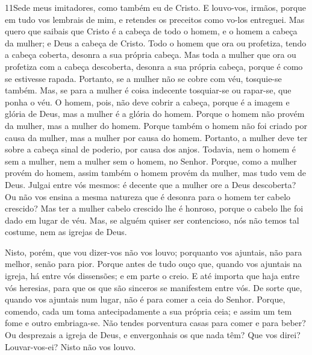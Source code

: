 \lettrine{11} Sede meus imitadores, como também eu de Cristo.
E louvo-vos, irmãos, porque em tudo vos lembrais de mim, e
retendes os preceitos como vo-los entreguei. Mas quero que
saibais que Cristo é a cabeça de todo o homem, e o homem a cabeça da
mulher; e Deus a cabeça de Cristo. Todo o homem que ora ou
profetiza, tendo a cabeça coberta, desonra a sua própria cabeça.
Mas toda a mulher que ora ou profetiza com a cabeça descoberta,
desonra a sua própria cabeça, porque é como se estivesse rapada.
Portanto, se a mulher não se cobre com véu, tosquie-se também.
Mas, se para a mulher é coisa indecente tosquiar-se ou rapar-se, que
ponha o véu. O homem, pois, não deve cobrir a cabeça, porque é a
imagem e glória de Deus, mas a mulher é a glória do homem.
Porque o homem não provém da mulher, mas a mulher do homem.
Porque também o homem não foi criado por causa da mulher, mas a
mulher por causa do homem. Portanto, a mulher deve ter sobre
a cabeça sinal de poderio, por causa dos anjos. Todavia, nem
o homem é sem a mulher, nem a mulher sem o homem, no Senhor.
Porque, como a mulher provém do homem, assim também o homem
provém da mulher, mas tudo vem de Deus. Julgai entre vós
mesmos: é decente que a mulher ore a Deus descoberta? Ou não
vos ensina a mesma natureza que é desonra para o homem ter cabelo
crescido? Mas ter a mulher cabelo crescido lhe é honroso,
porque o cabelo lhe foi dado em lugar de véu. Mas, se alguém
quiser ser contencioso, nós não temos tal costume, nem as igrejas de
Deus.

Nisto, porém, que vou dizer-vos não vos louvo; porquanto vos
ajuntais, não para melhor, senão para pior. Porque antes de
tudo ouço que, quando vos ajuntais na igreja, há entre vós
dissensões; e em parte o creio. E até importa que haja entre
vós heresias, para que os que são sinceros se manifestem entre vós.
De sorte que, quando vos ajuntais num lugar, não é para comer
a ceia do Senhor. Porque, comendo, cada um toma
antecipadamente a sua própria ceia; e assim um tem fome e outro
embriaga-se. Não tendes porventura casas para comer e para
beber? Ou desprezais a igreja de Deus, e envergonhais os que nada
têm? Que vos direi? Louvar-vos-ei? Nisto não vos louvo.

